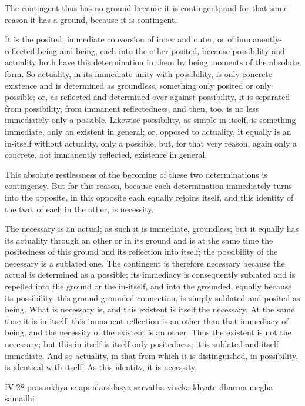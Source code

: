 The contingent thus has no ground because it is contingent;
and for that same reason it has a ground, because it is contingent.

It is the posited, immediate conversion of inner and outer,
or of immanently-reflected-being and being,
each into the other posited,
because possibility and actuality
both have this determination in them
by being moments of the absolute form.
So actuality, in its immediate unity with possibility,
is only concrete existence and is determined as groundless,
something only posited or only possible;
or, as reflected and determined over against possibility,
it is separated from possibility,
from immanent reflectedness,
and then, too, is no less
immediately only a possible.
Likewise possibility, as simple in-itself,
is something immediate,
only an existent in general;
or, opposed to actuality,
it equally is an in-itself
without actuality, only a possible,
but, for that very reason,
again only a concrete,
not immanently reflected,
existence in general.

This absolute restlessness of the becoming of
these two determinations is contingency.
But for this reason, because each determination
immediately turns into the opposite,
in this opposite each equally rejoins itself,
and this identity of the two,
of each in the other,
is necessity.

The necessary is an actual;
as such it is immediate, groundless;
but it equally has its actuality
through an other or in its ground
and is at the same time the positedness of this ground
and its reflection into itself;
the possibility of the necessary is a sublated one.
The contingent is therefore necessary
because the actual is determined as a possible;
its immediacy is consequently sublated
and is repelled into the ground or the in-itself,
and into the grounded, equally because its possibility,
this ground-grounded-connection,
is simply sublated and posited as being.
What is necessary is,
and this existent is itself the necessary.
At the same time it is in itself;
this immanent reflection is an other than that immediacy of being,
and the necessity of the existent is an other.
Thus the existent is not the necessary;
but this in-itself is itself only positedness;
it is sublated and itself immediate.
And so actuality, in that from which it is distinguished,
in possibility, is identical with itself.
As this identity, it is necessity.

IV.28
prasankhyane api-akusidasya sarvatha viveka-khyate dharma-megha samadhi

